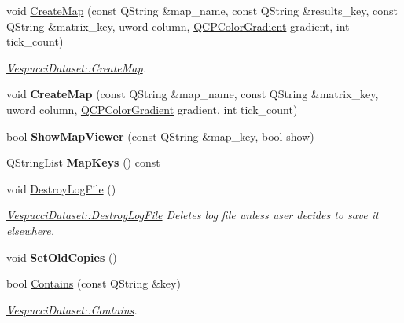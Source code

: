 \begin{DoxyCompactItemize}
\item 
void \hyperlink{class_vespucci_dataset_ac8e42c9ec0bc1d58c8b9133f1084b258}{Create\+Map} (const Q\+String \&map\+\_\+name, const Q\+String \&results\+\_\+key, const Q\+String \&matrix\+\_\+key, uword column, \hyperlink{class_q_c_p_color_gradient}{Q\+C\+P\+Color\+Gradient} gradient, int tick\+\_\+count)
\begin{DoxyCompactList}\small\item\em \hyperlink{class_vespucci_dataset_ac8e42c9ec0bc1d58c8b9133f1084b258}{Vespucci\+Dataset\+::\+Create\+Map}. \end{DoxyCompactList}\item 
void {\bfseries Create\+Map} (const Q\+String \&map\+\_\+name, const Q\+String \&matrix\+\_\+key, uword column, \hyperlink{class_q_c_p_color_gradient}{Q\+C\+P\+Color\+Gradient} gradient, int tick\+\_\+count)\hypertarget{class_vespucci_dataset_a1856ac5a06be700ea2575a7aa5753462}{}\label{class_vespucci_dataset_a1856ac5a06be700ea2575a7aa5753462}

\item 
bool {\bfseries Show\+Map\+Viewer} (const Q\+String \&map\+\_\+key, bool show)\hypertarget{class_vespucci_dataset_a7fad78ea55c6b3366aa17d308a3ba4d8}{}\label{class_vespucci_dataset_a7fad78ea55c6b3366aa17d308a3ba4d8}

\item 
Q\+String\+List {\bfseries Map\+Keys} () const \hypertarget{class_vespucci_dataset_abf155344d38a1c1f92d7fab269475d59}{}\label{class_vespucci_dataset_abf155344d38a1c1f92d7fab269475d59}

\item 
void \hyperlink{class_vespucci_dataset_aca08389cff2f9aa5c0bfb5d41adbc994}{Destroy\+Log\+File} ()\hypertarget{class_vespucci_dataset_aca08389cff2f9aa5c0bfb5d41adbc994}{}\label{class_vespucci_dataset_aca08389cff2f9aa5c0bfb5d41adbc994}

\begin{DoxyCompactList}\small\item\em \hyperlink{class_vespucci_dataset_aca08389cff2f9aa5c0bfb5d41adbc994}{Vespucci\+Dataset\+::\+Destroy\+Log\+File} Deletes log file unless user decides to save it elsewhere. \end{DoxyCompactList}\item 
void {\bfseries Set\+Old\+Copies} ()\hypertarget{class_vespucci_dataset_ab092b6f1366082df96091fdd3eb5fcfb}{}\label{class_vespucci_dataset_ab092b6f1366082df96091fdd3eb5fcfb}

\item 
bool \hyperlink{class_vespucci_dataset_ae24279cec673bf96d338120bdd192062}{Contains} (const Q\+String \&key)
\begin{DoxyCompactList}\small\item\em \hyperlink{class_vespucci_dataset_ae24279cec673bf96d338120bdd192062}{Vespucci\+Dataset\+::\+Contains}. \end{DoxyCompactList}\end{DoxyCompactItemize}
